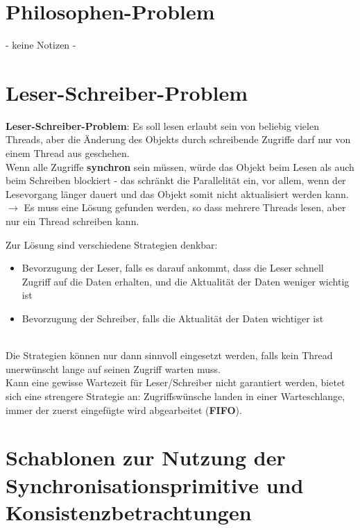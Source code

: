 \section{Philosophen-Problem}
  - keine Notizen -

\section{Leser-Schreiber-Problem}

\textbf{Leser-Schreiber-Problem}: Es soll lesen erlaubt sein von beliebig vielen Threads, aber die Änderung des Objekts durch schreibende Zugriffe darf nur von einem Thread aus geschehen.\\

\noindent
Wenn alle Zugriffe \textbf{synchron} sein müssen, würde das Objekt beim Lesen als auch beim Schreiben blockiert - das schränkt die Parallelität ein, vor allem, wenn der Lesevorgang länger dauert und das Objekt somit nicht aktualisiert werden kann.\\

\noindent
$\rightarrow$ Es muss eine Lösung gefunden werden, so dass mehrere Threads lesen, aber nur ein Thread schreiben kann.

Zur Lösung sind verschiedene Strategien denkbar:

\begin{itemize}
    \item Bevorzugung der Leser, falls es darauf ankommt, dass die Leser schnell Zugriff auf die Daten erhalten, und die Aktualität der Daten weniger wichtig ist
    \item Bevorzugung der Schreiber, falls die Aktualität der Daten wichtiger ist
\end{itemize}\\

\noindent
Die Strategien können nur dann sinnvoll eingesetzt werden, falls kein Thread unerwünscht lange auf seinen Zugriff warten muss.\\
Kann eine gewisse Wartezeit für Leser/Schreiber nicht garantiert werden, bietet sich eine strengere Strategie an: Zugriffswünsche landen in einer Warteschlange, immer der zuerst eingefügte wird abgearbeitet (\textbf{FIFO}).


\section{Schablonen zur Nutzung der Synchronisationsprimitive und Konsistenzbetrachtungen}

